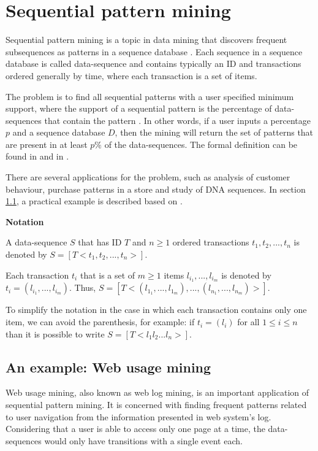 \section{Sequential pattern mining}
\label{sec-seqmining}

Sequential pattern mining is a topic in data mining that discovers frequent subsequences as patterns in a sequence
database \cite{Nizar}. Each sequence in a sequence database is called data-sequence and contains typically an ID and transactions ordered generally by time, where each transaction is a set of items.

The problem is to find all sequential patterns with a user specified minimum support, where the support of a sequential pattern is the percentage of data-sequences that contain the pattern \cite{Rakesh}. In other words, if a user inputs a percentage $p$ and a sequence database $D$, then the mining will return the set of patterns that are present in at least $p\%$ of the data-sequences. The formal definition can be found in \cite{Nizar} and in \cite{Pei}.

There are several applications for the problem, such as analysis of customer behaviour, purchase patterns in a store and study of DNA sequences. In section \ref{webusage}, a practical example is described based on \cite{Nizar}.

\textbf{Notation}

A data-sequence $S$ that has ID $T$ and $n \geq 1$ ordered transactions $t_1,t_2,...,t_n$ is denoted by $S = [T <t_1,t_2,...,t_n>]$. 

Each transaction $t_i$ that is a set of $m \geq 1$ items $l_{i_1},...,l_{i_m}$ is denoted by $t_i = (l_{i_1},...,l_{i_m})$. Thus, $S = [T <(l_{1_1},...,l_{1_m}), ... ,(l_{n_1},...,l_{n_m})>]$. 

To simplify the notation in the case in which each transaction contains only one item, we can avoid the parenthesis, for example: if $t_i = (l_i)$ for all $ 1 \leq i \leq n$ than it is possible to write $S = [T <l_1l_2...l_n>]$.


\subsection{An example: Web usage mining}
\label{webusage}

Web usage mining, also known as web log mining, is an important application of sequential pattern mining. It is concerned with finding frequent patterns related to user navigation from the information presented in web system's log. Considering that a user is able to access only one page at a time, the data-sequences would only have transitions with a single event each.

